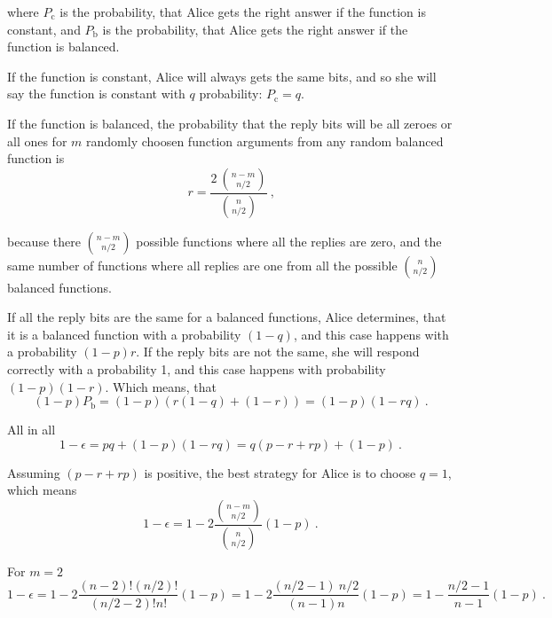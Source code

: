 \documentclass[a4paper,12pt]{article}
\begin{document}
    \noindent
    where $P_{\textrm{c}}$ is the probability, that Alice gets the right answer if the function is constant, and $P_{\textrm{b}}$ is the probability, that Alice gets the right answer if the function is balanced.

    If the function is constant, Alice will always gets the same bits, and so she will say the function is constant with $q$ probability: $P_{\textrm{c}} = q$.

    If the function is balanced, the probability that the reply bits will be all zeroes or all ones for $m$ randomly choosen function arguments from any random balanced function is
    \begin{equation}
      r = \frac{2\ {{n - m}\choose{n / 2}}}{{{n}\choose{n / 2}}}\ \textrm{,}
    \end{equation}

    \noindent
    because there ${{n - m}\choose{n / 2}}$ possible functions where all the replies are zero, and the same number of functions where all replies are one from all the possible ${{n}\choose{n / 2}}$ balanced functions.

    If all the reply bits are the same for a balanced functions, Alice determines, that it is a balanced function with a probability $(1 - q)$, and this case happens with a probability $(1 - p) r$. If the reply bits are not the same, she will respond correctly with a probability 1, and this case happens with probability $(1 - p)(1 - r)$. Which means, that
    \begin{equation}
      (1 - p) P_{\textrm{b}} = (1 - p) (r (1 - q) + (1 - r)) = (1 - p) (1 - rq)\ \textrm{.}
    \end{equation}

    All in all
    \begin{equation}
      1 - \epsilon = pq + (1 - p) (1 - rq) = q(p - r + rp) + (1 - p)\ \textrm{.}
    \end{equation}

    \noindent
    Assuming $(p - r + rp)$ is positive, the best strategy for Alice is to choose $q = 1$, which means
    \begin{equation}
      1 - \epsilon = 1 - 2\frac{{{n - m}\choose{n / 2}}}{{{n}\choose{n / 2}}}(1 - p)\ \textrm{.}
    \end{equation}

    For $m = 2$
    \begin{equation}
      1 - \epsilon = 1 - 2\frac{(n - 2)! (n/2)!}{(n/2 - 2)! n!}(1 - p) = 1 - 2\frac{(n/2 - 1)\ n/2}{(n - 1)n}(1 - p) = 1 - \frac{n/2 - 1}{n - 1} (1 - p)\ \textrm{.}
    \end{equation}
\end{document}
